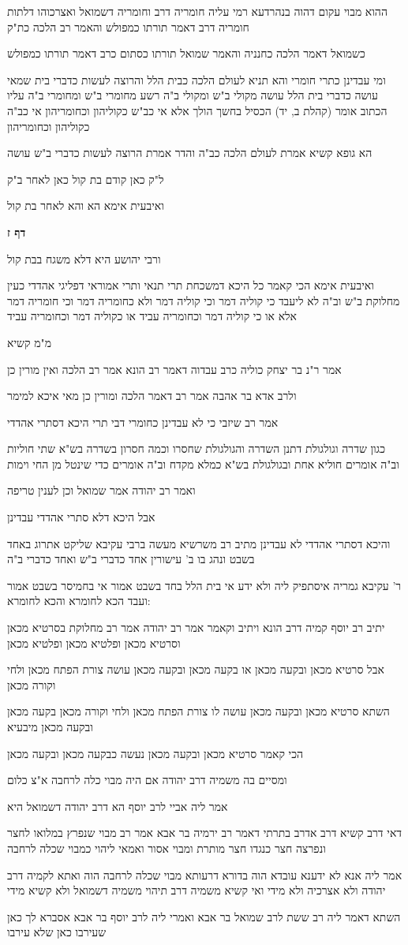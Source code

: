 \documentclass[12pt, openany]{book}
\newcommand{\sethebfont}{
\fontsize{10.5pt}{21.0pt} \selectfont
}
\newcommand{\textblock}[1]{
{\sethebfont #1\\}	
}
\newcommand{\sectname}{}
\newcommand{\newsection}[1]{
	\addcontentsline{toc}{section}{#1}
	\renewcommand{\sectname}{#1}	
	\vspace{-\baselineskip}
	\begin{center}
		\textbf{%
\fontsize{16pt}{16pt}\selectfont
			#1}
	\end{center}
	\vspace{-\baselineskip}
	\nopagebreak
}
\begin{document}
\textblock{ההוא מבוי עקום דהוה בנהרדעא רמי עליה חומריה דרב וחומריה דשמואל ואצרכוהו דלתות חומריה דרב דאמר תורתו כמפולש והאמר רב הלכה כת"ק}
\textblock{כשמואל דאמר הלכה כחנניה והאמר שמואל תורתו כסתום כרב דאמר תורתו כמפולש}
\textblock{ומי עבדינן כתרי חומרי והא תניא לעולם הלכה כבית הלל והרוצה לעשות כדברי בית שמאי עושה כדברי בית הלל עושה מקולי ב"ש ומקולי ב"ה רשע מחומרי ב"ש ומחומרי ב"ה עליו הכתוב אומר (קהלת ב, יד) הכסיל בחשך הולך אלא אי כב"ש כקוליהון וכחומריהון אי כב"ה כקוליהון וכחומריהון}
\textblock{הא גופא קשיא אמרת לעולם הלכה כב"ה והדר אמרת הרוצה לעשות כדברי ב"ש עושה}
\textblock{ל"ק כאן קודם בת קול כאן לאחר ב"ק}
\textblock{ואיבעית אימא הא והא לאחר בת קול}
\newsection{דף ז}
\textblock{ורבי יהושע היא דלא משגח בבת קול}
\textblock{ואיבעית אימא הכי קאמר כל היכא דמשכחת תרי תנאי ותרי אמוראי דפליגי אהדדי כעין מחלוקת ב"ש וב"ה לא ליעבד כי קוליה דמר וכי קוליה דמר ולא כחומריה דמר וכי חומריה דמר אלא או כי קוליה דמר וכחומריה עביד או כקוליה דמר וכחומריה עביד}
\textblock{מ"מ קשיא}
\textblock{אמר ר"נ בר יצחק כוליה כרב עבדוה דאמר רב הונא אמר רב הלכה ואין מורין כן}
\textblock{ולרב אדא בר אהבה אמר רב דאמר הלכה ומורין כן מאי איכא למימר}
\textblock{אמר רב שיזבי כי לא עבדינן כחומרי דבי תרי היכא דסתרי אהדדי}
\textblock{כגון שדרה וגולגולת דתנן השדרה והגולגולת שחסרו וכמה חסרון בשדרה בש"א שתי חוליות וב"ה אומרים חוליא אחת ובגולגולת בש"א כמלא מקדח וב"ה אומרים כדי שינטל מן החי וימות}
\textblock{ואמר רב יהודה אמר שמואל וכן לענין טריפה}
\textblock{אבל היכא דלא סתרי אהדדי עבדינן}
\textblock{והיכא דסתרי אהדדי לא עבדינן מתיב רב משרשיא מעשה ברבי עקיבא שליקט אתרוג באחד בשבט ונהג בו ב' עישורין אחד כדברי ב"ש ואחד כדברי ב"ה}
\textblock{ר' עקיבא גמריה איסתפיק ליה ולא ידע אי בית הלל בחד בשבט אמור אי בחמיסר בשבט אמור ועבד הכא לחומרא והכא לחומרא:}
\textblock{יתיב רב יוסף קמיה דרב הונא ויתיב וקאמר אמר רב יהודה אמר רב מחלוקת בסרטיא מכאן וסרטיא מכאן ופלטיא מכאן ופלטיא מכאן}
\textblock{אבל סרטיא מכאן ובקעה מכאן או בקעה מכאן ובקעה מכאן עושה צורת הפתח מכאן ולחי וקורה מכאן}
\textblock{השתא סרטיא מכאן ובקעה מכאן עושה לו צורת הפתח מכאן ולחי וקורה מכאן בקעה מכאן ובקעה מכאן מיבעיא}
\textblock{הכי קאמר סרטיא מכאן ובקעה מכאן נעשה כבקעה מכאן ובקעה מכאן}
\textblock{ומסיים בה משמיה דרב יהודה אם היה מבוי כלה לרחבה א"צ כלום}
\textblock{אמר ליה אביי לרב יוסף הא דרב יהודה דשמואל היא}
\textblock{דאי דרב קשיא דרב אדרב בתרתי דאמר רב ירמיה בר אבא אמר רב מבוי שנפרץ במלואו לחצר ונפרצה חצר כנגדו חצר מותרת ומבוי אסור ואמאי ליהוי כמבוי שכלה לרחבה}
\textblock{אמר ליה אנא לא ידענא עובדא הוה בדורא דרעותא מבוי שכלה לרחבה הוה ואתא לקמיה דרב יהודה ולא אצרכיה ולא מידי ואי קשיא משמיה דרב תיהוי משמיה דשמואל ולא קשיא מידי}
\textblock{השתא דאמר ליה רב ששת לרב שמואל בר אבא ואמרי ליה לרב יוסף בר אבא אסברא לך כאן שעירבו כאן שלא עירבו}
\end{document}
